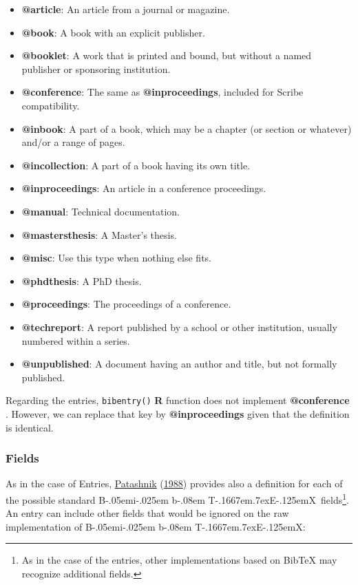 \documentclass[
]{article}
\providecommand{\tightlist}{%
  \setlength{\itemsep}{0pt}\setlength{\parskip}{0pt}}
\def\BibTeX{{\rm B\kern-.05em{\sc i\kern-.025em b}\kern-.08em
    T\kern-.1667em\lower.7ex\hbox{E}\kern-.125emX}}
\begin{document}
\begin{itemize}
\tightlist
\item
  \textbf{@article}: An article from a journal or magazine.
\item
  \textbf{@book}: A book with an explicit publisher.
\item
  \textbf{@booklet}: A work that is printed and bound, but without a
  named publisher or sponsoring institution.
\item
  \textbf{@conference}: The same as \textbf{@inproceedings}, included
  for Scribe compatibility.
\item
  \textbf{@inbook}: A part of a book, which may be a chapter (or section
  or whatever) and/or a range of pages.
\item
  \textbf{@incollection}: A part of a book having its own title.
\item
  \textbf{@inproceedings}: An article in a conference proceedings.
\item
  \textbf{@manual}: Technical documentation.
\item
  \textbf{@mastersthesis}: A Master's thesis.
\item
  \textbf{@misc}: Use this type when nothing else fits.
\item
  \textbf{@phdthesis}: A PhD thesis.
\item
  \textbf{@proceedings}: The proceedings of a conference.
\item
  \textbf{@techreport}: A report published by a school or other
  institution, usually numbered within a series.
\item
  \textbf{@unpublished}: A document having an author and title, but not
  formally published.
\end{itemize}

Regarding the entries, \texttt{bibentry()} \textbf{R} function does not
implement \textbf{@conference} . However, we can replace that key by
\textbf{@inproceedings} given that the definition is identical.

\hypertarget{fields}{%
\subsubsection{Fields}\label{fields}}

As in the case of Entries,
\protect\hyperlink{ref-patashnik1988}{Patashnik}
(\protect\hyperlink{ref-patashnik1988}{1988}) provides also a definition
for each of the possible standard \BibTeX~fields\footnote{As in the case
  of the entries, other implementations based on BibTeX may recognize
  additional fields.}. An entry can include other fields that would be
ignored on the raw implementation of \BibTeX:
\end{document}
